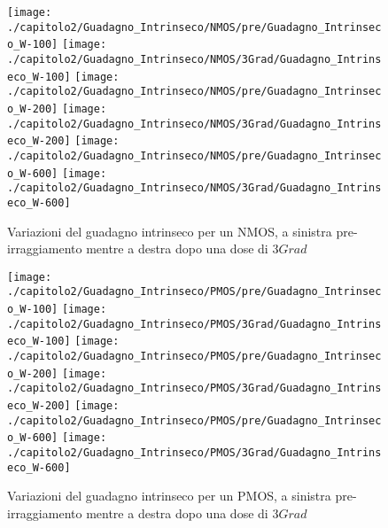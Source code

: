 \begin{figure}[ht]
    \centering
    \texttt{[image: ./capitolo2/Guadagno\_Intrinseco/NMOS/pre/Guadagno\_Intrinseco\_W-100]}
    \texttt{[image: ./capitolo2/Guadagno\_Intrinseco/NMOS/3Grad/Guadagno\_Intrinseco\_W-100]}
    \texttt{[image: ./capitolo2/Guadagno\_Intrinseco/NMOS/pre/Guadagno\_Intrinseco\_W-200]}
    \texttt{[image: ./capitolo2/Guadagno\_Intrinseco/NMOS/3Grad/Guadagno\_Intrinseco\_W-200]}
    \texttt{[image: ./capitolo2/Guadagno\_Intrinseco/NMOS/pre/Guadagno\_Intrinseco\_W-600]}
    \texttt{[image: ./capitolo2/Guadagno\_Intrinseco/NMOS/3Grad/Guadagno\_Intrinseco\_W-600]}

    \caption{Variazioni del guadagno intrinseco per un NMOS, a sinistra pre-irraggiamento mentre a destra dopo una dose di $3Grad$}
    \label{fig:guadagnoIntrinseco_N}
\end{figure}


\begin{figure}[ht]
    \centering
    \texttt{[image: ./capitolo2/Guadagno\_Intrinseco/PMOS/pre/Guadagno\_Intrinseco\_W-100]}
    \texttt{[image: ./capitolo2/Guadagno\_Intrinseco/PMOS/3Grad/Guadagno\_Intrinseco\_W-100]}
    \texttt{[image: ./capitolo2/Guadagno\_Intrinseco/PMOS/pre/Guadagno\_Intrinseco\_W-200]}
    \texttt{[image: ./capitolo2/Guadagno\_Intrinseco/PMOS/3Grad/Guadagno\_Intrinseco\_W-200]}
    \texttt{[image: ./capitolo2/Guadagno\_Intrinseco/PMOS/pre/Guadagno\_Intrinseco\_W-600]}
    \texttt{[image: ./capitolo2/Guadagno\_Intrinseco/PMOS/3Grad/Guadagno\_Intrinseco\_W-600]}

    \caption{Variazioni del guadagno intrinseco per un PMOS, a sinistra pre-irraggiamento mentre a destra dopo una dose di $3Grad$}
    \label{fig:guadagnoIntrinseco_P}
\end{figure}